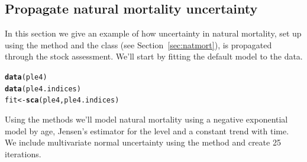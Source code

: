 \documentclass[a4paper,english,10pt]{article}\usepackage[]{graphicx}\usepackage[]{color}
\makeatletter
\newcommand{\hlstd}[1]{\textcolor[rgb]{0.345,0.345,0.345}{#1}}%
\newcommand{\hlkwb}[1]{\textcolor[rgb]{0.69,0.353,0.396}{#1}}%
\newcommand{\hlkwd}[1]{\textcolor[rgb]{0.737,0.353,0.396}{\textbf{#1}}}%
\newenvironment{kframe}{%
 \def\at@end@of@kframe{}%
 \ifinner\ifhmode%
  \def\at@end@of@kframe{\end{minipage}}%
  \begin{minipage}{\columnwidth}%
 \fi\fi%
 \def\FrameCommand##1{\hskip\@totalleftmargin \hskip-\fboxsep
 \colorbox{shadecolor}{##1}\hskip-\fboxsep
     \hskip-\linewidth \hskip-\@totalleftmargin \hskip\columnwidth}%
 \MakeFramed {\advance\hsize-\width
   \@totalleftmargin\z@ \linewidth\hsize
   \@setminipage}}%
 {\par\unskip\endMakeFramed%
 \at@end@of@kframe}
\newenvironment{knitrout}{}{} %
\makeatother
\begin{document}
\subsection{Propagate natural mortality uncertainty}

In this section we give an example of how uncertainty in natural mortality, set up using the  method and the class  (see Section~\ref{sec:natmort}), is propagated through the stock assessment. We'll start by fitting the default model to the data. 

\begin{knitrout}
\color{fgcolor}\begin{kframe}
\begin{alltt}
\hlkwd{data}\hlstd{(ple4)}
\hlkwd{data}\hlstd{(ple4.indices)}
\hlstd{fit} \hlkwb{<-} \hlkwd{sca}\hlstd{(ple4, ple4.indices)}
\end{alltt}
\end{kframe}
\end{knitrout}

Using the \aFa methods we'll model natural mortality using a negative exponential model by age, Jensen's estimator for the level and a constant trend with time. We include multivariate normal uncertainty using the  method and create 25 iterations. 
\end{document}
